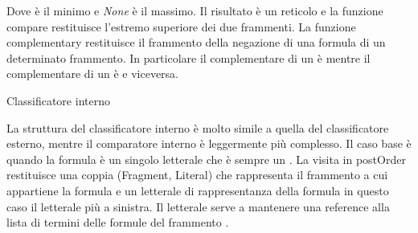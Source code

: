 \documentclass[./main.tex]{subfiles}
\begin{document}
Dove \ob è il minimo e \textit{None} è il massimo.
Il risultato è un reticolo e la funzione compare restituisce l'estremo superiore dei due frammenti.
La funzione complementary restituisce il frammento della negazione di una formula di un determinato frammento.
In particolare il complementare di un \ob è \ob mentre il complementare di un \cb è \dbb e viceversa.



\begin{algorithm}[H] \label{alg:innerClassifier}
    \caption{Classificatore interno}


\end{algorithm}

La struttura del classificatore interno è molto simile a quella del classificatore esterno, mentre il comparatore interno
è leggermente più complesso. Il caso base è quando la formula è un singolo letterale che è sempre un \ob.
La visita in postOrder restituisce una coppia (Fragment, Literal) che rappresenta il frammento a cui appartiene la formula e un letterale
di rappresentanza della formula in questo caso il letterale più a sinistra. 
Il letterale serve a mantenere una reference alla lista di termini delle formule del frammento \ob.
\end{document}
